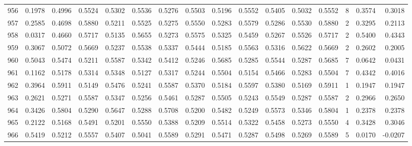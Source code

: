 \begin{tabular}{lrrrrrrrrrrrrrrr}
956 &      0.1978 &  0.4996 &  0.5524 &  0.5302 &  0.5536 &  0.5276 &  0.5503 &  0.5196 &  0.5552 &  0.5405 &   0.5032 &     0.5552 &      8 &                    0.3574 &                     0.3018 \\
957 &      0.2585 &  0.4698 &  0.5880 &  0.5211 &  0.5525 &  0.5275 &  0.5550 &  0.5283 &  0.5579 &  0.5286 &   0.5530 &     0.5880 &      2 &                    0.3295 &                     0.2113 \\
958 &      0.0317 &  0.4660 &  0.5717 &  0.5135 &  0.5655 &  0.5273 &  0.5575 &  0.5325 &  0.5459 &  0.5267 &   0.5526 &     0.5717 &      2 &                    0.5400 &                     0.4343 \\
959 &      0.3067 &  0.5072 &  0.5669 &  0.5237 &  0.5538 &  0.5337 &  0.5444 &  0.5185 &  0.5563 &  0.5316 &   0.5622 &     0.5669 &      2 &                    0.2602 &                     0.2005 \\
960 &      0.5043 &  0.5474 &  0.5211 &  0.5587 &  0.5342 &  0.5412 &  0.5246 &  0.5685 &  0.5285 &  0.5544 &   0.5287 &     0.5685 &      7 &                    0.0642 &                     0.0431 \\
961 &      0.1162 &  0.5178 &  0.5314 &  0.5348 &  0.5127 &  0.5317 &  0.5244 &  0.5504 &  0.5154 &  0.5466 &   0.5283 &     0.5504 &      7 &                    0.4342 &                     0.4016 \\
962 &      0.3964 &  0.5911 &  0.5149 &  0.5476 &  0.5241 &  0.5587 &  0.5370 &  0.5184 &  0.5597 &  0.5380 &   0.5169 &     0.5911 &      1 &                    0.1947 &                     0.1947 \\
963 &      0.2621 &  0.5271 &  0.5587 &  0.5347 &  0.5256 &  0.5461 &  0.5287 &  0.5505 &  0.5243 &  0.5549 &   0.5287 &     0.5587 &      2 &                    0.2966 &                     0.2650 \\
964 &      0.3426 &  0.5804 &  0.5290 &  0.5647 &  0.5288 &  0.5708 &  0.5200 &  0.5482 &  0.5249 &  0.5573 &   0.5346 &     0.5804 &      1 &                    0.2378 &                     0.2378 \\
965 &      0.2122 &  0.5168 &  0.5491 &  0.5201 &  0.5550 &  0.5388 &  0.5209 &  0.5514 &  0.5322 &  0.5458 &   0.5273 &     0.5550 &      4 &                    0.3428 &                     0.3046 \\
966 &      0.5419 &  0.5212 &  0.5557 &  0.5407 &  0.5041 &  0.5589 &  0.5291 &  0.5471 &  0.5287 &  0.5498 &   0.5269 &     0.5589 &      5 &                    0.0170 &                    -0.0207 \\

\end{tabular}
